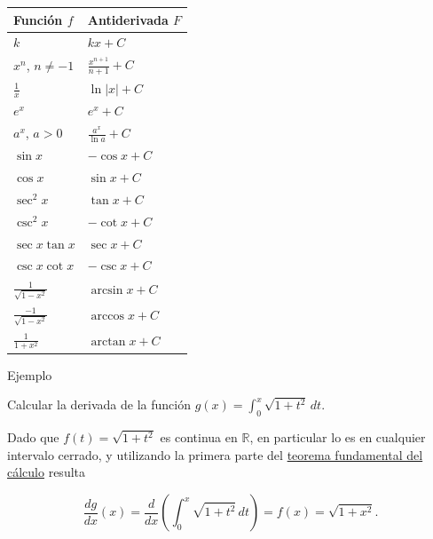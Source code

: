 \documentclass[
  letterpaper,
]{book}
\theoremstyle{plain}
\theoremstyle{remark}
\begin{document}
\label{tabla-antiderivadas}
\begin{longtable}[]{@{}ll@{}}
\toprule\noalign{}
Función \(f\) & Antiderivada \(F\) \\
\midrule\noalign{}
\endhead
\bottomrule\noalign{}
\endlastfoot
\(k\) & \(kx+C\) \\
\(x^n\), \(n\neq -1\) & \(\displaystyle\frac{x^{n+1}}{n+1}+C\) \\
\(\displaystyle\frac{1}{x}\) & \(\ln|x|+C\) \\
\(e^x\) & \(e^x+C\) \\
\(a^x\), \(a>0\) & \(\displaystyle\frac{a^x}{\ln a} + C\) \\
\(\sin x\) & \(-\cos x + C\) \\
\(\cos x\) & \(\sin x + C\) \\
\(\sec^2 x\) & \(\tan x + C\) \\
\(\csc^2 x\) & \(-\cot x + C\) \\
\(\sec x \tan x\) & \(\sec x + C\) \\
\(\csc x \cot x\) & \(-\csc x + C\) \\
\(\displaystyle \frac{1}{\sqrt{1 - x^2}}\) & \(\arcsin x + C\) \\
\(\displaystyle\frac{-1}{\sqrt{1 - x^2}}\) & \(\arccos x + C\) \\
\(\displaystyle \frac{1}{1 + x^2}\) & \(\arctan x + C\) \\
\end{longtable}

Ejemplo

Calcular la derivada de la función
\(\displaystyle g(x)=\int_0^x \sqrt{1+t^2}\,dt\).

\begin{tcolorbox}[enhanced jigsaw, opacityback=0, left=2mm, opacitybacktitle=0.6, toprule=.15mm, bottomrule=.15mm, colbacktitle=quarto-callout-tip-color!10!white, titlerule=0mm, bottomtitle=1mm, title=\textcolor{quarto-callout-tip-color}{\faLightbulb}\hspace{0.5em}{Solución}, toptitle=1mm, colframe=quarto-callout-tip-color-frame, colback=white, breakable, rightrule=.15mm, arc=.35mm, leftrule=.75mm, coltitle=black]

Dado que \(f(t)=\sqrt{1+t^2}\) es continua en \(\mathbb{R}\), en
particular lo es en cualquier intervalo cerrado, y utilizando la primera
parte del \hyperref[teo-TFC1]{teorema fundamental del cálculo} resulta

\[
\frac{dg}{dx}(x)=\frac{d}{dx}\left(\int_0^x \sqrt{1+t^2}\,dt\right)=f(x)=\sqrt{1+x^2}.
\]

\end{tcolorbox}
\end{document}
